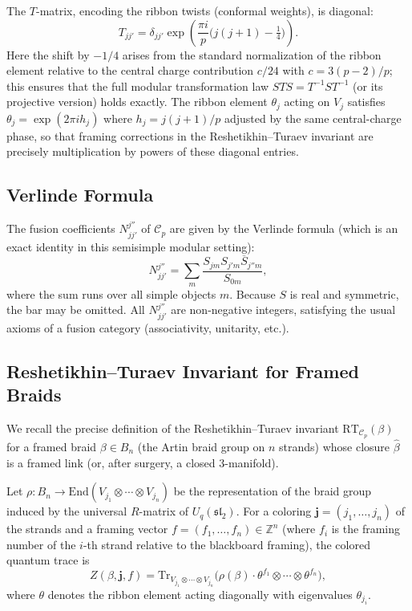 The \(T\)-matrix, encoding the ribbon twists (conformal weights), is diagonal:
\[
T_{jj'} = \delta_{jj'} \exp\left( \frac{\pi i}{p} \bigl( j(j+1) - \tfrac{1}{4} \bigr) \right).
\]
Here the shift by \(-1/4\) arises from the standard normalization of the ribbon element relative to the central charge contribution \(c/24\) with \(c = 3(p-2)/p\); this ensures that the full modular transformation law \(S T S = T^{-1} S T^{-1}\) (or its projective version) holds exactly. The ribbon element \(\theta_j\) acting on \(V_j\) satisfies \(\theta_j = \exp(2\pi i h_j)\) where \(h_j = j(j+1)/p\) adjusted by the same central-charge phase, so that framing corrections in the Reshetikhin--Turaev invariant are precisely multiplication by powers of these diagonal entries.

\subsection{Verlinde Formula}

The fusion coefficients \(N_{j j'}^{j''}\) of \(\mathcal{C}_p\) are given by the Verlinde formula (which is an exact identity in this semisimple modular setting):
\[
N_{j j'}^{j''} = \sum_{m} \frac{S_{j m} S_{j' m} \overline{S}_{j'' m}}{S_{0 m}},
\]
where the sum runs over all simple objects \(m\). Because \(S\) is real and symmetric, the bar may be omitted. All \(N_{j j'}^{j''}\) are non-negative integers, satisfying the usual axioms of a fusion category (associativity, unitarity, etc.).

\subsection{Reshetikhin--Turaev Invariant for Framed Braids}

We recall the precise definition of the Reshetikhin--Turaev invariant \(\mathrm{RT}_{\mathcal{C}_p}(\beta)\) for a framed braid \(\beta \in B_n\) (the Artin braid group on \(n\) strands) whose closure \(\hat{\beta}\) is a framed link (or, after surgery, a closed 3-manifold). 

Let \(\rho: B_n \to \mathrm{End}(V_{j_1} \otimes \cdots \otimes V_{j_n})\) be the representation of the braid group induced by the universal \(R\)-matrix of \(U_q(\mathfrak{sl}_2)\). For a coloring \(\mathbf{j} = (j_1, \dots, j_n)\) of the strands and a framing vector \(f = (f_1, \dots, f_n) \in \mathbb{Z}^n\) (where \(f_i\) is the framing number of the \(i\)-th strand relative to the blackboard framing), the colored quantum trace is
\[
Z(\beta, \mathbf{j}, f) = \mathrm{Tr}_{V_{j_1} \otimes \cdots \otimes V_{j_n}} \bigl( \rho(\beta) \cdot \theta^{f_1} \otimes \cdots \otimes \theta^{f_n} \bigr),
\]
where \(\theta\) denotes the ribbon element acting diagonally with eigenvalues \(\theta_{j_i}\). 

